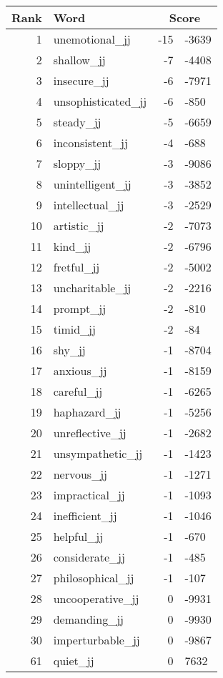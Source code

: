 \begin{longtable}[!htbp]{| rlr@{.}l |}
    \hline
    \textbf{Rank} & \textbf{Word} & \multicolumn{2}{c|}{\textbf{Score}} \\
    \hline
    \endhead
    1 & unemotional\_jj & -15 & -3639 \\
    2 & shallow\_jj & -7 & -4408 \\
    3 & insecure\_jj & -6 & -7971 \\
    4 & unsophisticated\_jj & -6 & -850 \\
    5 & steady\_jj & -5 & -6659 \\
    6 & inconsistent\_jj & -4 & -688 \\
    7 & sloppy\_jj & -3 & -9086 \\
    8 & unintelligent\_jj & -3 & -3852 \\
    9 & intellectual\_jj & -3 & -2529 \\
    10 & artistic\_jj & -2 & -7073 \\
    11 & kind\_jj & -2 & -6796 \\
    12 & fretful\_jj & -2 & -5002 \\
    13 & uncharitable\_jj & -2 & -2216 \\
    14 & prompt\_jj & -2 & -810 \\
    15 & timid\_jj & -2 & -84 \\
    16 & shy\_jj & -1 & -8704 \\
    17 & anxious\_jj & -1 & -8159 \\
    18 & careful\_jj & -1 & -6265 \\
    19 & haphazard\_jj & -1 & -5256 \\
    20 & unreflective\_jj & -1 & -2682 \\
    21 & unsympathetic\_jj & -1 & -1423 \\
    22 & nervous\_jj & -1 & -1271 \\
    23 & impractical\_jj & -1 & -1093 \\
    24 & inefficient\_jj & -1 & -1046 \\
    25 & helpful\_jj & -1 & -670 \\
    26 & considerate\_jj & -1 & -485 \\
    27 & philosophical\_jj & -1 & -107 \\
    28 & uncooperative\_jj & 0 & -9931 \\
    29 & demanding\_jj & 0 & -9930 \\
    30 & imperturbable\_jj & 0 & -9867 \\
    61 & quiet\_jj & 0 & 7632 \\

\end{longtable}
